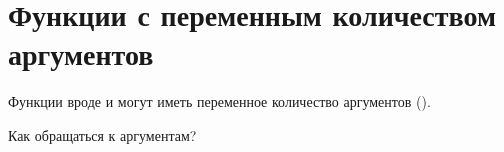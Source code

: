 \section{Функции с переменным количеством аргументов}

Функции вроде \printf и \scanf могут иметь переменное количество аргументов ().

Как обращаться к аргументам?



